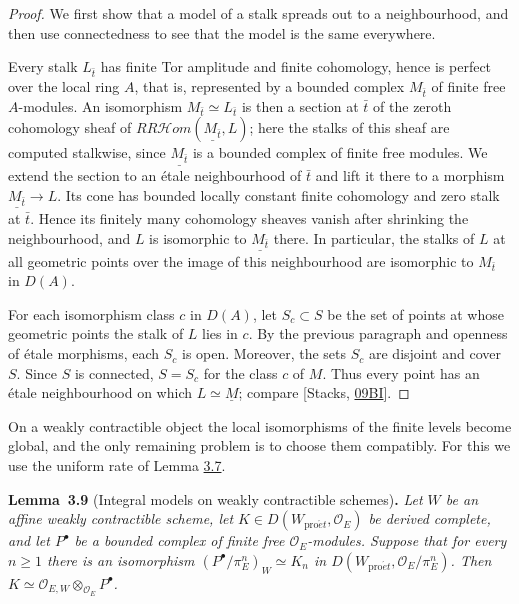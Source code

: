 \documentclass[11pt]{article}
\newenvironment{bpstatement}[2]{\par\addvspace{0.6\baselineskip}\noindent\textbf{#1}#2\textbf{.}\enspace\ignorespaces}
  {\par\addvspace{0.4\baselineskip}}
\newenvironment{bpstatementit}[2]{\begin{bpstatement}{#1}{#2}\itshape\ignorespaces}{\end{bpstatement}}
\providecommand{\cHom}{}\renewcommand{\cHom}{R\mathcal{H}\!om}
\begin{document}
\begin{proof}[{Proof}]\label{bp219}%
We first show that a model of a stalk spreads out to a neighbourhood, and then use connectedness to see that the model is the same everywhere.

Every stalk \(L_{\bar t}\) has finite Tor amplitude and finite cohomology, hence is perfect over the local ring \(A\), that is, represented by a bounded complex \(M_{\bar t}\) of finite free \(A\)-modules. An isomorphism \(M_{\bar t}\simeq L_{\bar t}\) is then a section at \(\bar t\) of the zeroth cohomology sheaf of \(R\cHom(\underline{M_{\bar t}},L)\); here the stalks of this sheaf are computed stalkwise, since \(\underline{M_{\bar t}}\) is a bounded complex of finite free modules. We extend the section to an étale neighbourhood of \(\bar t\) and lift it there to a morphism \(\underline{M_{\bar t}}\to L\). Its cone has bounded locally constant finite cohomology and zero stalk at \(\bar t\). Hence its finitely many cohomology sheaves vanish after shrinking the neighbourhood, and \(L\) is isomorphic to \(\underline{M_{\bar t}}\) there. In particular, the stalks of \(L\) at all geometric points over the image of this neighbourhood are isomorphic to \(M_{\bar t}\) in \(D(A)\).

For each isomorphism class \(c\) in \(D(A)\), let \(S_c\subset S\) be the set of points at whose geometric points the stalk of \(L\) lies in \(c\). By the previous paragraph and openness of étale morphisms, each \(S_c\) is open. Moreover, the sets \(S_c\) are disjoint and cover \(S\). Since \(S\) is connected, \(S=S_c\) for the class \(c\) of \(M\). Thus every point has an étale neighbourhood on which \(L\simeq\underline M\); compare [Stacks, \href{https://stacks.math.columbia.edu/tag/09BI}{09BI}].
\end{proof}

\label{bp220}%
On a weakly contractible object the local isomorphisms of the finite levels become global, and the only remaining problem is to choose them compatibly. For this we use the uniform rate of Lemma \hyperref[bp214]{3.7}.

\label{bp221}%
\begin{bpstatementit}{Lemma~3.9}{ (Integral models on weakly contractible schemes)}
Let \(W\) be an affine weakly contractible scheme, let \(K\in D(W_{\mathrm{pro}\acute{e}t},\mathcal O_E)\) be derived complete, and let \(P^\bullet\) be a bounded complex of finite free \(\mathcal O_E\)-modules. Suppose that for every \(n\geq1\) there is an isomorphism \((P^\bullet/\pi_E^n)_W\simeq K_n\) in \(D(W_{\mathrm{pro}\acute{e}t},\mathcal O_E/\pi_E^n)\). Then \(K\simeq\mathcal O_{E,W}\otimes_{\mathcal O_E}P^\bullet\).
\end{bpstatementit}
\end{document}
